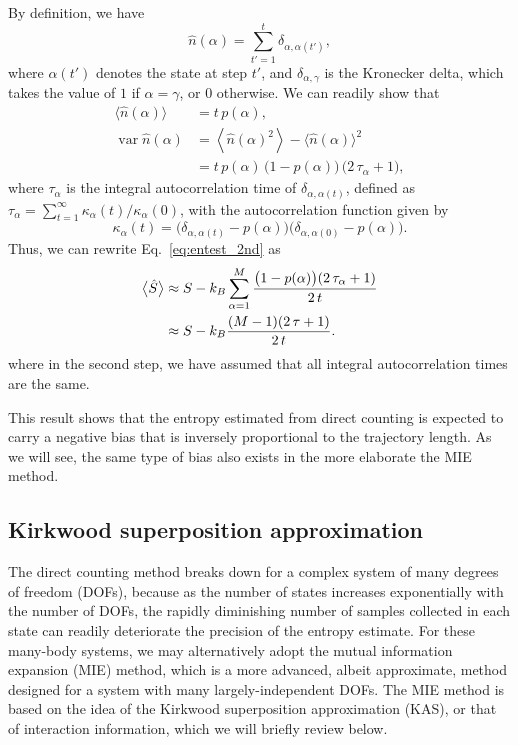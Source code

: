 \documentclass[reprint, superscriptaddress]{revtex4-1}
\begin{document}
By definition, we have
%
\begin{equation*}
  \hat{n}(\alpha) = \sum_{t' = 1}^t \delta_{\alpha, \alpha(t')},
\end{equation*}
%
where $\alpha(t')$ denotes the state at step $t'$,
and $\delta_{\alpha, \gamma}$ is the Kronecker delta,
which takes the value of $1$ if $\alpha = \gamma$, or $0$ otherwise.
%
We can readily show that
\begin{align*}
  \bigl\langle \hat{n}(\alpha) \bigr\rangle
  &=
  t \, p(\alpha), \\
  \operatorname{var}{\hat{n}(\alpha)}
  &=
  \left\langle \hat{n}(\alpha)^2 \right\rangle - \langle \hat{n}(\alpha) \rangle^2
  \\
  &=
  t \, p(\alpha) \, \bigl( 1 - p(\alpha) \bigr) \, \bigl(2 \, \tau_\alpha + 1\bigr)
  ,
\end{align*}
%
where $\tau_\alpha$ is the integral autocorrelation time of $\delta_{\alpha, \alpha(t)}$,
defined as $\tau_\alpha = \sum_{t = 1}^\infty \kappa_\alpha(t)/\kappa_\alpha(0)$,
with the autocorrelation function given by
$$
\kappa_\alpha(t) = \bigl(\delta_{\alpha, \alpha(t)} - p(\alpha)\bigr)
\bigl(\delta_{\alpha, \alpha(0)} - p(\alpha)\bigr).
$$
%
Thus, we can rewrite Eq.~\eqref{eq:entest_2nd} as
%
\begin{align}
  \bigl\langle \hat S \bigr\rangle
  &\approx
  S - k_B \sum_{\alpha = 1}^M
    \frac{ \bigl(1 - p(\alpha)\bigr) ( 2 \, \tau_\alpha + 1) } { 2 \, t }
  \notag\\
  &\approx
  S - k_B
    \frac{ (M - 1) ( 2 \, \tau + 1) } { 2 \, t }
  .
  \label{eq:Shat_ave}
\end{align}
where in the second step,
we have assumed that all integral autocorrelation times are the same.

This result shows that the entropy estimated
from direct counting
is expected to carry a negative bias
that is inversely proportional to the trajectory length.
%
As we will see, the same type of bias also exists
in the more elaborate the MIE method.


\subsection{Kirkwood superposition approximation}


The direct counting method breaks down
for a complex system of many degrees of freedom (DOFs),
because as the number of states increases exponentially with the number of DOFs,
the rapidly diminishing number of samples collected in each state
can readily deteriorate the precision of the entropy estimate.
%
For these many-body systems,
we may alternatively adopt
the mutual information expansion (MIE) method,
which is a more advanced, albeit approximate, method designed for a system
with many largely-independent DOFs.
%
The MIE method is based on the idea of
the Kirkwood superposition approximation (KAS)\cite{kirkwood1935, born1946},
or that of interaction information\cite{mcgill1954},
which we will briefly review below.
\end{document}
